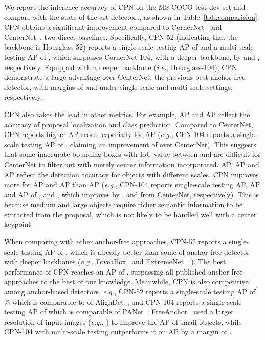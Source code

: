 \documentclass[runningheads]{llncs}
\begin{document}
We report the inference accuracy of CPN on the MS-COCO test-dev set and compare with the state-of-the-art detectors, as shown in Table~\ref{tab:comparision}. CPN obtains a significant improvement compared to CornerNet~\cite{law2018cornernet} and CenterNet~\cite{duan2019centernet}, two direct baselines. Specifically, CPN-52 (indicating that the backbone is Hourglass-52) reports a single-scale testing AP of  and a multi-scale testing AP of , which surpasses CornerNet-104, with a deeper backbone, by  and , respectively. Equipped with a deeper backbone (\textit{i.e.}, Hourglass-104), CPN demonstrate a large advantage over CenterNet, the previous best anchor-free detector, with margins of  and  under single-scale and multi-scale settings, respectively.

CPN also takes the lead in other metrics. For example, AP and AP reflect the accuracy of proposal localization and class prediction. Compared to CenterNet, CPN reports higher AP scores especially for AP (\textit{e.g.}, CPN-104 reports a single-scale testing AP of , claiming an improvement of  over CenterNet). This suggests that some inaccurate bounding boxes with IoU value between  and  are difficult for CenterNet to filter out with merely center information incorporated. AP, AP and AP reflect the detection accuracy for objects with different scales. CPN improves more for AP and AP than AP (\textit{e.g.}, CPN-104 reports single-scale testing AP, AP and AP of ,  and , which improves by ,  and  from CenterNet, respectively). This is because medium and large objects require richer semantic information to be extracted from the proposal, which is not likely to be handled well with a center keypoint.

When comparing with other anchor-free approaches, CPN-52 reports a single-scale testing AP of , which is already better than some of anchor-free detector with deeper backbones (\textit{e.g.}, FoveaBox~\cite{kong2020foveabox} and ExtremeNet~\cite{zhou2019bottom}~). The best performance of CPN reaches an AP of , surpassing all published anchor-free approaches to the best of our knowledge. Meanwhile, CPN is also competitive among anchor-based detectors, \textit{e.g.}, CPN-52 reports a single-scale testing AP of \% which is comparable to  of AlignDet~\cite{chen2019revisiting}, and CPN-104 reports a single-scale testing AP of  which is comparable  of PANet~\cite{liu2018path}. FreeAnchor~\cite{zhang2019freeanchor} used a larger resolution of input images (\textit{e.g.}, ) to improve the AP of small objects, while CPN-104 with multi-scale testing outperforms it on AP by a margin of .
\end{document}
